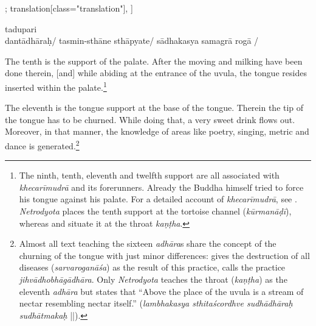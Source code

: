 \begin{alignment}[
  texts=edition[class="edition"];
  translation[class="translation"],
  ]
\begin{edition}
\begin{prose}[p30_04]
tadupari
\\
dantādhāraḥ/
tasmin-sthāne
sthāpyate/
sādhakasya samagrā rogā
/
    \end{prose}
  \end{edition}
  \begin{translation}
    \begin{tlate}[p30_04]
      \noindent
      The tenth is the support of the palate. After the moving and milking have been done therein, [and] while abiding at the entrance of the uvula, the tongue resides inserted within the palate.\footnote{The ninth, tenth, eleventh and twelfth support are all associated with \textit{khecarīmudrā} and its forerunners. Already the Buddha himself tried to force his tongue against his palate. For a detailed account of \textit{khecarīmudrā}, see \citeauthor{mallinson2010}. \textit{Netrodyota} places the tenth support at the tortoise channel (\textit{kūrmanāḍī}), whereas  and  situate it at the throat \textit{kaṇṭha}.}
      
      The eleventh is the tongue support at the base of the tongue. Therein the tip of the tongue has to be churned. While doing that, a very sweet drink flows out. Moreover, in that manner, the knowledge of areas like poetry, singing, metric and dance is generated.\footnote{Almost all text teaching the sixteen \textit{adhāra}s share the concept of the churning of the tongue with just minor differences:  gives the destruction of all diseases (\textit{sarvaroganāśa}) as the result of this practice,  calls the practice \textit{jihvādhobhāgādhāra}. Only \textit{Netrodyota} teaches the throat (\textit{kaṇṭha}) as the eleventh \textit{adhāra} but states that ``Above the place of the uvula is a stream of nectar resembling nectar itself.'' (\textit{lambhakasya sthitaścordhve sudhādhāraḥ sudhātmakaḥ} ||).}
    

\end{tlate}
\end{translation}
\end{alignment}
